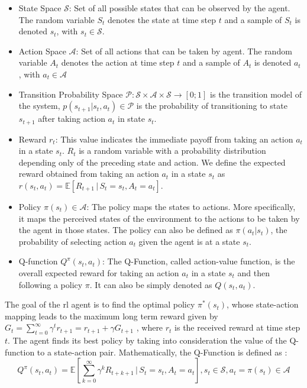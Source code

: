 \begin{itemize}
  \item State Space $\mathcal{S}$: Set of all possible states that can be observed by the agent. The random variable $S_t$ denotes the state at time step $t$ and a sample of $S_t$ is denoted $s_t$, with $s_t \in \mathcal{S}$.
  \item Action Space $\mathcal{A}$: Set of all actions that can be taken by agent. The random variable $A_t$ denotes the action at time step $t$ and a sample of $A_t$ is denoted $a_t$, with $a_t \in \mathcal{A}$
  \item Transition Probability Space $\mathcal{P}: \mathcal{S} \times \mathcal{A} \times \mathcal{S} \rightarrow [0;1]$ is the transition model of the system, $p(s_{t+1} | s_t,a_t) \in \mathcal{P}$ is the probability of transitioning to state $s_{t+1}$ after taking action $a_t$ in state $s_t$.
  \item Reward  $r_t$: This value indicates the immediate payoff from taking an action $a_t$ in a state $s_t$. $R_t$ is a random variable with a probability distribution depending only of the preceding state and action. We define the expected reward obtained from taking an action $a_t$ in a state $s_t$ as $r(s_t,a_t) = \mathbb{E}\left[R_{t+1} \, | \, S_t = s_t, A_t = a_t \right] $.
  \item Policy $\pi(s_t) \in \mathcal{A} $: The policy maps the states to actions. More specifically, it maps the perceived states of the environment to the actions to be taken by the agent in those states. The policy can also be defined as $\pi(a_t | s_t)$, the probability of selecting action $a_t$ given the agent is at a state $s_t$.
  \item Q-function $Q^{\pi}(s_t,a_t)$:  The Q-Function, called action-value function, is the overall expected reward for taking an action $a_t$ in a state $s_t$ and then following a policy $\pi$. It can also be simply denoted as $Q(s_t,a_t)$.
\end{itemize}


The goal of the \gls{rl} agent is to find the optimal policy $\pi^{*}(s_t)$, whose state-action mapping leads to the maximum long term reward given by $G_t = \sum_{t=0}^{\infty} \gamma^{t} r_{t+1} = r_{t+1} + \gamma G_{t+1} $ \cite{kaelbling1996reinforcement}, where $r_t$ is the received reward at time step $t$.
%
The agent finds its best policy by taking into consideration the value of the Q-function to a state-action pair.
%
Mathematically, the Q-Function is defined as \cite{2010Szepesvari}:
\begin{equation} \label{eq.:eqQvalue}
  Q^{\pi}(s_t, a_t)=\mathbb{E}\left[\sum_{k=0}^{\infty} \gamma^{k} R_{t+k+1} \, | \, S_t = s_t, A_t = a_t \right], s_t \in \mathcal{S}, a_t = \pi (s_t) \in \mathcal{A}
\end{equation}


